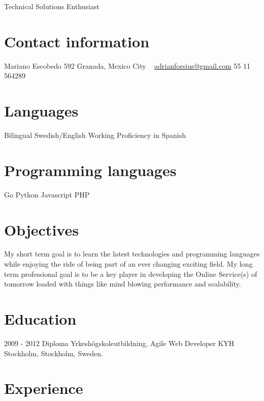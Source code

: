 \documentclass[]{friggeri-cv}
\begin{document}
       {Technical Solutions Enthusiast}

\begin{aside}
  \section{Contact information}
    Mariano Escobedo 592
    Granada, Mexico City
    ~
    \href{mailto:adrianforsius@gmail.com}{adrianforsius@gmail.com}
    55 11 564289
  \section{Languages}
    Bilingual Swedish/English
    Working Proficiency in Spanish
  \section{Programming languages}
    Go
    Python
    Javascript
    PHP
\end{aside}

\section{Objectives}
    My short term goal is to learn the latest technologies and programming languages while enjoying the ride of being part of an ever changing exciting field.
    My long term professional goal is to be a key player in developing the Online Service(s) of tomorrow loaded with things like mind blowing performance and scalability.

\section{Education}

\begin{entrylist}
  \entry
    {2009 - 2012}
    {Diploma Yrkeshögskoleutbildning, Agile Web Developer}
    {}
    {KYH Stockholm, Stockholm, Sweden.}
\end{entrylist}

\section{Experience}
\end{document}
